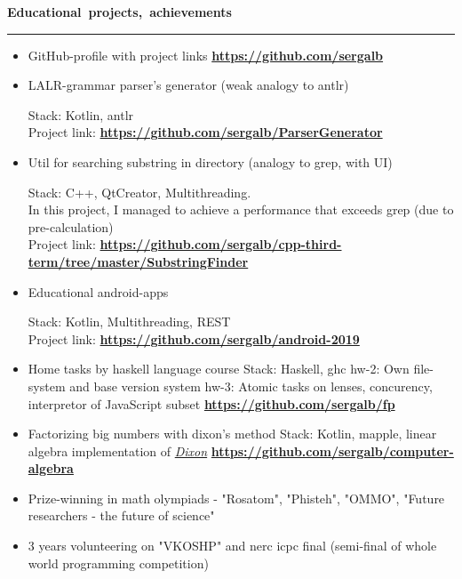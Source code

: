 \documentclass[10pt, a4paper]{report}
\begin{document}
    \par\hbox{\large\textbf{Educational projects, achievements}}\kern5pt\hrule\kern5pt
    \begin{itemize}

        \item GitHub-profile with project links \textbf{\url{https://github.com/sergalb}}

        \item LALR-grammar parser's generator (weak analogy to  antlr)

        Stack: Kotlin, antlr\\
        Project link:
        \textbf{
        \url{https://github.com/sergalb/ParserGenerator}
        }

        \item Util for searching substring in directory (analogy to grep, with UI)

        Stack: C++, QtCreator, Multithreading.\\
        In this project, I managed to achieve a performance that exceeds grep (due to pre-calculation)\\
        Project link:
        \textbf{
        \url{https://github.com/sergalb/cpp-third-term/tree/master/SubstringFinder}
        }

        \item Educational android-apps

        Stack: Kotlin, Multithreading, REST\\
        Project link:
        \textbf{
        \url{https://github.com/sergalb/android-2019}
        }

        \item Home tasks by haskell language course
        Stack: Haskell, ghc
        hw-2: Own file-system and base version system
        hw-3: Atomic tasks on lenses, concurency, interpretor of JavaScript subset
        \textbf{
        \url{https://github.com/sergalb/fp}
        }

        \item Factorizing big numbers with dixon's method
        Stack: Kotlin, mapple, linear algebra
        implementation of \href{https://en.wikipedia.org/wiki/Dixon%27s_factorization_method}{\textit{Dixon}}
        \textbf{
        \url{https://github.com/sergalb/computer-algebra}
        }

        \item Prize-winning in math olympiads - "Rosatom", "Phisteh", "OMMO", "Future researchers - the future of science"
        \item 3 years volunteering on "VKOSHP" and nerc icpc final (semi-final of whole world programming competition)
    \end{itemize}
\end{document}
